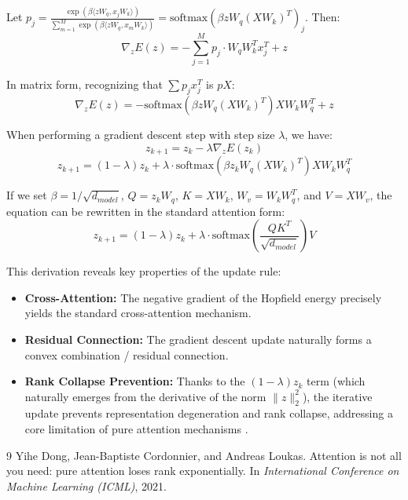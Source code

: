 \documentclass[11pt,a4paper]{article}
\begin{document}
Let $p_j = \frac{\exp(\beta \langle z W_q, x_j W_k \rangle)}{\sum_{m=1}^M \exp(\beta \langle z W_q, x_m W_k \rangle)} = \text{softmax}(\beta z W_q (X W_k)^T)_j$. Then:
\begin{equation}
    \nabla_z E(z) = - \sum_{j=1}^M p_j \cdot W_q W_k^T x_j^T + z
\end{equation}

In matrix form, recognizing that $\sum p_j x_j^T$ is $p X$:
\begin{equation}
    \nabla_z E(z) = - \text{softmax}(\beta z W_q (X W_k)^T) X W_k W_q^T + z
\end{equation}

When performing a gradient descent step with step size $\lambda$, we have:
\begin{equation}
    z_{k+1} = z_k - \lambda \nabla_z E(z_k)
\end{equation}
\begin{equation}
    z_{k+1} = (1 - \lambda) z_k + \lambda \cdot \text{softmax}(\beta z_k W_q (X W_k)^T) X W_k W_q^T
\end{equation}

If we set $\beta = 1/\sqrt{d_{model}}$, $Q = z_k W_q$, $K = X W_k$, $W_v = W_k W_q^T$, and $V = X W_v$, the equation can be rewritten in the standard attention form:
\begin{equation}
    z_{k+1} = (1 - \lambda) z_k + \lambda \cdot \text{softmax}\left( \frac{Q K^T}{\sqrt{d_{model}}} \right) V
\end{equation}

This derivation reveals key properties of the update rule:
\begin{itemize}[leftmargin=1.5em]
    \item \textbf{Cross-Attention:} The negative gradient of the Hopfield energy precisely yields the standard cross-attention mechanism.
    \item \textbf{Residual Connection:} The gradient descent update naturally forms a convex combination / residual connection.
    \item \textbf{Rank Collapse Prevention:} Thanks to the $(1-\lambda) z_k$ term (which naturally emerges from the derivative of the norm $\|z\|_2^2$), the iterative update prevents representation degeneration and rank collapse, addressing a core limitation of pure attention mechanisms \cite{dong2021attention}.
\end{itemize}

\begin{thebibliography}{9}
Yihe Dong, Jean-Baptiste Cordonnier, and Andreas Loukas.
\newblock Attention is not all you need: pure attention loses rank exponentially.
\newblock In \textit{International Conference on Machine Learning (ICML)}, 2021.
\end{thebibliography}
\end{document}
